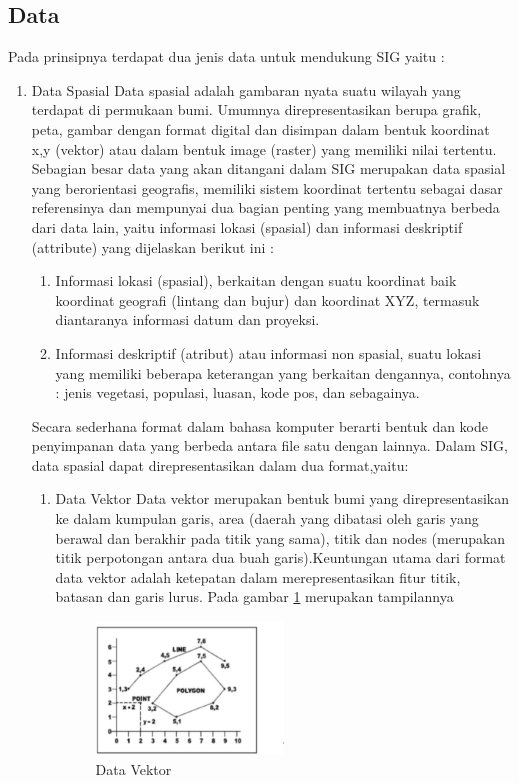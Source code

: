 \subsection{Data}
Pada prinsipnya terdapat dua jenis data untuk mendukung SIG yaitu :
\begin{enumerate}
\item Data Spasial
\subitem Data spasial adalah gambaran nyata suatu wilayah yang terdapat di permukaan bumi. Umumnya direpresentasikan berupa grafik, peta, gambar dengan format digital dan disimpan dalam bentuk koordinat x,y (vektor) atau dalam bentuk image (raster) yang memiliki nilai tertentu.
Sebagian besar data yang akan ditangani dalam SIG merupakan data spasial yang berorientasi geografis, memiliki sistem koordinat tertentu sebagai dasar referensinya dan mempunyai dua bagian penting yang membuatnya berbeda dari data lain, yaitu informasi lokasi (spasial) dan informasi deskriptif (attribute) yang dijelaskan berikut ini :

\begin{enumerate}
\item Informasi lokasi (spasial), berkaitan dengan suatu koordinat baik koordinat geografi (lintang dan bujur) dan koordinat XYZ, termasuk diantaranya informasi datum dan proyeksi.
\item Informasi deskriptif (atribut) atau informasi non spasial, suatu lokasi yang memiliki beberapa keterangan yang berkaitan dengannya, contohnya : jenis vegetasi, populasi, luasan, kode pos, dan sebagainya.
\end{enumerate}

Secara sederhana format dalam bahasa komputer berarti bentuk dan kode penyimpanan data yang berbeda antara file satu dengan lainnya. Dalam SIG, data spasial dapat direpresentasikan dalam dua format,yaitu:
\begin{enumerate}
\item Data Vektor
Data vektor merupakan bentuk bumi yang direpresentasikan ke dalam kumpulan garis, area (daerah yang dibatasi oleh garis yang berawal dan berakhir pada titik yang sama), titik dan nodes (merupakan titik perpotongan antara dua buah garis).Keuntungan utama dari format data vektor adalah ketepatan dalam merepresentasikan fitur titik, batasan dan garis lurus. Pada gambar \ref{data_vektor} merupakan tampilannya
\begin{figure}[ht]
\centering
\includegraphics[width=0.5\textwidth]{pictures/data_vektor}
\caption{Data Vektor}
\label{data_vektor}
\end{figure}



\end{enumerate}
\end{enumerate}
